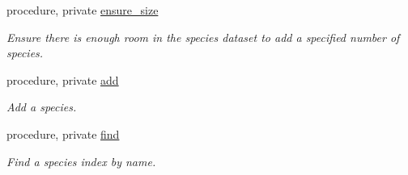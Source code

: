 \begin{DoxyCompactItemize}
procedure, private \mbox{\hyperlink{structpmc__aero__phase__data_1_1aero__phase__data__t_abd4628d8c9dcdc3a0840aacd02c76113}{ensure\+\_\+size}}
\begin{DoxyCompactList}\small\item\em Ensure there is enough room in the species dataset to add a specified number of species. \end{DoxyCompactList}\item 
procedure, private \mbox{\hyperlink{structpmc__aero__phase__data_1_1aero__phase__data__t_a60538113eb720a872a59f81d9e8c29c7}{add}}
\begin{DoxyCompactList}\small\item\em Add a species. \end{DoxyCompactList}\item 
procedure, private \mbox{\hyperlink{structpmc__aero__phase__data_1_1aero__phase__data__t_a8eb6cda543ae6883e54a90b6d1d2ec2f}{find}}
\begin{DoxyCompactList}\small\item\em Find a species index by name. \end{DoxyCompactList}\end{DoxyCompactItemize}
